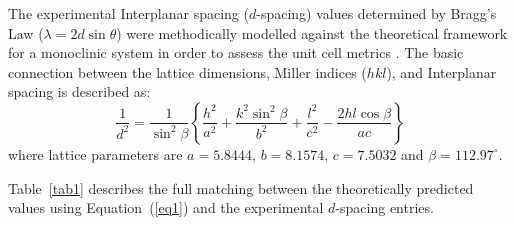 \documentclass[10pt]{NSP1}
\begin{document}
The experimental Interplanar spacing ($d$-spacing) values determined by Bragg's Law ($\lambda = 2d \sin\theta$) were methodically modelled against the theoretical framework for a monoclinic system in order to assess the unit cell metrics \cite{R16,R17}. The basic connection between the lattice dimensions, Miller indices ($hkl$), and Interplanar spacing is described as:
\begin{equation}
\frac{1}{d^2} = \frac{1}{\sin^2\beta} \left\{ \frac{h^2}{a^2} + \frac{k^2 \sin^2\beta}{b^2} + \frac{l^2}{c^2} - \frac{2hl\cos\beta}{ac} \right\} \label{eq1}
\end{equation}
where lattice parameters are $a = 5.8444$, $b = 8.1574$, $c = 7.5032$ and $\beta = 112.97^\circ$.

Table~\ref{tab1} describes the full matching between the theoretically predicted values using Equation~(\ref{eq1}) and the experimental $d$-spacing entries.
\end{document}
